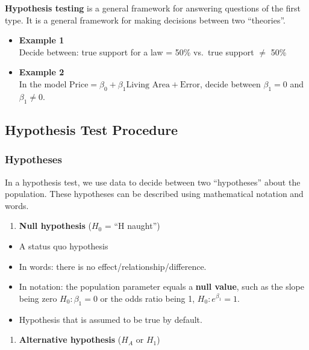 \documentclass[
]{book}
\providecommand{\tightlist}{%
  \setlength{\itemsep}{0pt}\setlength{\parskip}{0pt}}
\begin{document}
\textbf{Hypothesis testing} is a general framework for answering questions of the first type. It is a general framework for making decisions between two ``theories''.

\begin{itemize}
\item
  \textbf{Example 1}\\
  Decide between: true support for a law = 50\% vs.~true support \(\neq\) 50\%
\item
  \textbf{Example 2}\\
  In the model \(\text{Price} = \beta_0 + \beta_1\text{Living Area} + \text{Error}\), decide between \(\beta_1 = 0\) and \(\beta_1 \neq 0\).
\end{itemize}

\subsection{Hypothesis Test Procedure}\label{hypothesis-test-procedure}

\subsubsection{Hypotheses}\label{hypotheses}

In a hypothesis test, we use data to decide between two ``hypotheses'' about the population. These hypotheses can be described using mathematical notation and words.

\begin{enumerate}
\def\labelenumi{\arabic{enumi}.}
\tightlist
\item
  \textbf{Null hypothesis} (\(H_0\) = ``H naught'')\\
\end{enumerate}

\begin{itemize}
\tightlist
\item
  A status quo hypothesis
\item
  In words: there is no effect/relationship/difference.
\item
  In notation: the population parameter equals a \textbf{null value}, such as the slope being zero \(H_0: \beta_1 = 0\) or the odds ratio being 1, \(H_0: e^{\beta_1} = 1\).
\item
  Hypothesis that is assumed to be true by default.
\end{itemize}

\begin{enumerate}
\def\labelenumi{\arabic{enumi}.}
\setcounter{enumi}{1}
\tightlist
\item
  \textbf{Alternative hypothesis} (\(H_A\) or \(H_1\))\\
\end{enumerate}
\end{document}
